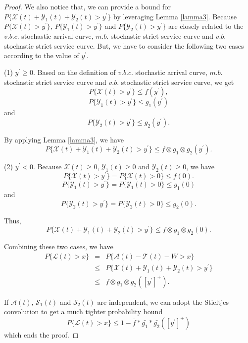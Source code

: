 \documentclass[paper]{ieice}
\newtheorem{proof}{Proof}
\begin{document}
\begin{proof}
We also notice that, we can provide a bound for $P\{\mathcal{X}(t)+\mathcal{Y}_1(t)+\mathcal{Y}_2(t)>y^\prime\}$ by leveraging Lemma \ref{lamma3}. Because $P\{\mathcal{X}(t)>y^\prime\}$, $P\{\mathcal{Y}_1(t)>y^\prime\}$ and $P\{\mathcal{Y}_2(t)>y^\prime\}$ are closely related to the $v.b.c.$ stochastic arrival curve, $m.b.$ stochastic strict service curve and $v.b.$ stochastic strict service curve. But, we have to consider the following two cases according to the value of $y^\prime$.

(1) $y^\prime\geq 0$. Based on the definition of $v.b.c.$ stochastic arrival curve, $m.b.$ stochastic strict service curve and $v.b.$ stochastic strict service curve, we get
$$P\{\mathcal{X}(t)>y^\prime\}\leq f(y^\prime),$$
$$P\{\mathcal{Y}_1(t)>y^\prime\}\leq g_1(y^\prime)$$
and
$$P\{\mathcal{Y}_2(t)>y^\prime\}\leq g_2(y^\prime).$$

By applying Lemma \ref{lamma3}, we have
\begin{equation}\label{equation1}
P\{\mathcal{X}(t)+\mathcal{Y}_1(t)+\mathcal{Y}_2(t)>y^\prime\}\leq f\otimes g_1\otimes g_2(y^\prime).
\end{equation}

(2) $y^\prime<0$. Because $\mathcal{X}(t)\geq 0$, $\mathcal{Y}_1(t)\geq 0$ and $\mathcal{Y}_2(t)\geq 0$, we have
$$P\{\mathcal{X}(t)>y^\prime\}=P\{\mathcal{X}(t)>0\}\leq f(0).$$
$$P\{\mathcal{Y}_1(t)>y^\prime\}=P\{\mathcal{Y}_1(t)>0\}\leq g_1(0)$$
and
$$P\{\mathcal{Y}_2(t)>y^\prime\}=P\{\mathcal{Y}_2(t)>0\}\leq g_2(0).$$

Thus,
\begin{equation}\label{equation2}
P\{\mathcal{X}(t)+\mathcal{Y}_1(t)+\mathcal{Y}_2(t)>y^\prime\}\leq f\otimes g_1\otimes g_2(0).
\end{equation}

Combining these two cases, we have
\begin{eqnarray*}
  P\{\mathcal{L}(t)>x\}&=&P\{\mathcal{A}(t)-\mathcal{T}(t)-W>x\}\\
  &\leq&P\{\mathcal{X}(t)+\mathcal{Y}_1(t)+\mathcal{Y}_2(t)>y^\prime\}\\
  &\leq& f\otimes g_1\otimes g_2([y^\prime]^+).
\end{eqnarray*}

If $\mathcal{A}(t)$, $\mathcal{S}_1(t)$ and $\mathcal{S}_2(t)$ are independent, we can adopt the Stieltjes convolution to get a much tighter probability bound
$$P\{\mathcal{L}(t)>x\}\leq 1-\bar{f}\ast\bar{g_1}\ast\bar{g_2}([y^\prime]^+)$$
which ends the proof.\QED
\end{proof}
\end{document}
